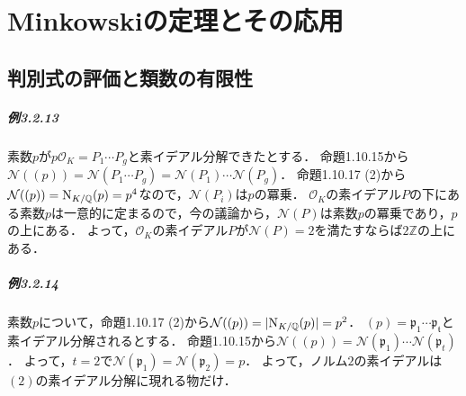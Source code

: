 \chapter{Minkowskiの定理とその応用}
\setcounter{section}{1}
\section{判別式の評価と類数の有限性}
\paragraph{例3.2.13}
素数$p$が$p\mathcal{O}_K=P_1\cdots P_g$と素イデアル分解できたとする．
命題1.10.15から$\mathcal{N}((p))=\mathcal{N}(P_1\cdots P_g)=\mathcal{N}(P_1)\cdots\mathcal{N}(P_g)$．
命題1.10.17 (2)から$\mathcal{N}((p))=\operatorname{N}_{K/\mathbb{Q}}(p)=p^4$なので，$\mathcal{N}(P_i)$は$p$の冪乗．
$\mathcal{O}_K$の素イデアル$P$の下にある素数$p$は一意的に定まるので，今の議論から，$\mathcal{N}(P)$は素数$p$の冪乗であり，$p$の上にある．
よって，$\mathcal{O}_K$の素イデアル$P$が$\mathcal{N}(P)=2$を満たすならば$2\mathbb{Z}$の上にある．

\paragraph{例3.2.14}
素数$p$について，命題1.10.17 (2)から$\mathcal{N}((p))=\lvert\operatorname{N}_{K/\mathbb{Q}}(p)\rvert=p^2$．
$(p)=\mathfrak{p}_1\cdots\mathfrak{p_t}$と素イデアル分解されるとする．
命題1.10.15から$\mathcal{N}((p))=\mathcal{N}(\mathfrak{p}_1)\cdots\mathcal{N}(\mathfrak{p}_t)$．
よって，$t=2$で$\mathcal{N}(\mathfrak{p}_1)=\mathcal{N}(\mathfrak{p}_2)=p$．
よって，ノルム$2$の素イデアルは$(2)$の素イデアル分解に現れる物だけ．

